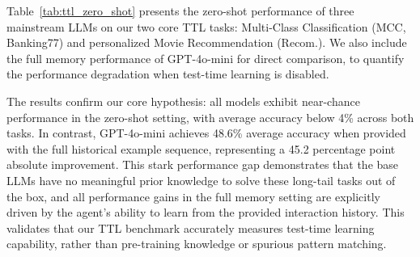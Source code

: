 Table~\ref{tab:ttl_zero_shot} presents the zero-shot performance of three mainstream LLMs on our two core TTL tasks: Multi-Class Classification (MCC, Banking77) and personalized Movie Recommendation (Recom.). We also include the full memory performance of GPT-4o-mini for direct comparison, to quantify the performance degradation when test-time learning is disabled.

\begin{table}[h!]
\centering
{}
\caption{Performance on Test-Time Learning (TTL) tasks under the zero-shot setting, compared to the full memory setting. All metrics are task accuracy, with higher values indicating better performance.}
\label{tab:ttl_zero_shot}
\end{table}

The results confirm our core hypothesis: all models exhibit near-chance performance in the zero-shot setting, with average accuracy below 4\% across both tasks. In contrast, GPT-4o-mini achieves 48.6\% average accuracy when provided with the full historical example sequence, representing a 45.2 percentage point absolute improvement. This stark performance gap demonstrates that the base LLMs have no meaningful prior knowledge to solve these long-tail tasks out of the box, and all performance gains in the full memory setting are explicitly driven by the agent's ability to learn from the provided interaction history. This validates that our TTL benchmark accurately measures test-time learning capability, rather than pre-training knowledge or spurious pattern matching.











